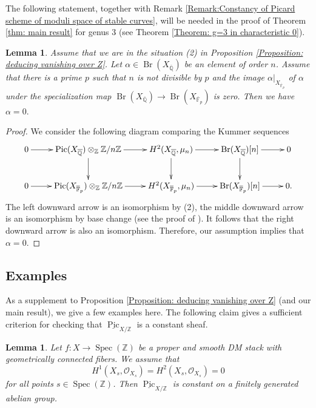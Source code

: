 \documentclass{amsart}
\newtheorem{lem}[prop]{Lemma}
\theoremstyle{definition}
\theoremstyle{remark}
\DeclareMathOperator{\Spec}{Spec}
\DeclareMathOperator{\Br}{Br}
\DeclareMathOperator{\Pic}{Pic}
\newcommand{\ZZ}{\mathbb Z}
\newcommand{\QQ}{\mathbb Q}
\begin{document}
The following statement, together with Remark \ref{Remark:Constancy of Picard scheme of moduli space of stable curves}, will be needed in the proof of Theorem \ref{thm: main result} for genus $3$ (see Theorem \ref{Theorem: g=3 in characteristic 0}).

\begin{lem}\label{Lemma: vanishing of Brauer class and reduction}
Assume that we are in the situation (2) in Proposition \ref{Proposition: deducing vanishing over Z}.
Let 
$\alpha\in \Br(X_{\overline{\QQ}})$
be an element of order $n$.
Assume that there is a prime $p$ such that
$n$ is not divisible by $p$ and the image
$\alpha\vert_{X_{\overline{\mathbb{F}}_{p}}}$
of $\alpha$ under the specialization map
$\Br(X_{\overline{\QQ}}) \to \Br(X_{\overline{\mathbb{F}}_{p}})$
is zero.
Then we have $\alpha=0.$
\end{lem}

\begin{proof}
We consider the following diagram comparing the Kummer sequences
$$
\xymatrix{
0 \ar[r] & \Pic(X_{\overline{\mathbb{Q}}})\otimes_{\ZZ}\ZZ/n\ZZ \ar[r] \ar[d] & H^{2}(X_{\overline{\mathbb{Q}}},\mu_{n}) \ar[r] \ar[d] & \Br(X_{\overline{\mathbb{Q}}})[n] \ar[d] \ar[r] & 0 \\
0 \ar[r] & \Pic(X_{\overline{\mathbb{F}}_{p}})\otimes_{\ZZ}\ZZ/n\ZZ \ar[r] & H^{2}(X_{\overline{\mathbb{F}}_{p}},\mu_{n}) \ar[r] & \Br(X_{\overline{\mathbb{F}}_{p}})[n] \ar[r] & 0.}
$$
The left downward arrow is an isomorphism by (2), the middle downward arrow is an isomorphism by base change (see the proof of \cite[Proposition 7.2]{fringuelli2023picardgroupschememoduli}).
It follows that the right downward arrow is also an isomorphism.
Therefore, our assumption implies that $\alpha=0.$
\end{proof}

\subsection{Examples}\label{Subsection: Examples}

As a supplement to Proposition \ref{Proposition: deducing vanishing over Z} (and our main result), we give a few examples here.
The following claim gives a sufficient criterion for checking that $\underline{\Pic}_{X/\ZZ}$ is a constant sheaf.

\begin{lem}\label{Lemma:constantness of Picard scheme}
Let $f\colon X\rightarrow \Spec(\ZZ)$ be a proper and smooth DM stack with geometrically connected fibers.
We assume that
\[
H^1(X_{s}, \mathcal{O}_{X_{s}})=H^2(X_{s}, \mathcal{O}_{X_{s}})=0
\]
for all points $s\in \Spec(\ZZ)$.
Then $\underline{\Pic}_{X/\ZZ}$ is constant on a finitely generated abelian group.
\end{lem}
\end{document}
